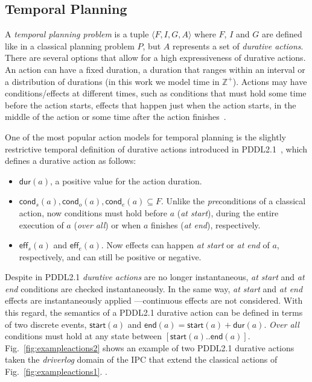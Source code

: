 \documentclass[runningheads]{llncs}
\newcommand{\tup}[1]{{\langle #1 \rangle}}
\newcommand{\eff}{\mathsf{eff}}    %
\newcommand{\cond}{\mathsf{cond}}  %
\newcommand{\dur}{\mathsf{dur}}    %
\newcommand{\start}{\mathsf{start}}%
\newcommand{\en}{\mathsf{end}}     %
\begin{document}
\subsection{Temporal Planning}
\label{sec:temporalplanning}
A {\em temporal planning problem} is a tuple $\tup{F,I,G,A}$ where $F$, $I$ and $G$ are defined like in a classical planning problem $P$, but $A$ represents a set of {\em durative actions}. There are several options that allow for a high expressiveness of durative actions. An action can have a fixed duration, a duration that ranges within an interval or a distribution of durations (in this work we model time in $\mathbb{Z}^+$). Actions may have conditions/effects at different times, such as conditions that must hold some time before the action starts, effects that happen just when the action starts, in the middle of the action or some time after the action finishes~\cite{garrido2009constraint}.

One of the most popular action models for temporal planning is the slightly restrictive temporal definition of durative actions introduced in PDDL2.1~\cite{fox2003pddl2}, which defines a durative action as follows:
\begin{itemize}
\item $\dur(a)$, a positive value for the action duration.
\item $\cond_s(a), \cond_o(a), \cond_e(a) \subseteq F$. Unlike the \emph{pre}conditions of a classical action, now conditions must hold before $a$ ({\em at start}), during the entire execution of $a$ ({\em over all}) or when $a$ finishes ({\em at end}), respectively.
\item $\eff_s(a)$ and $\eff_e(a)$. Now effects can happen {\em at start} or {\em at end} of $a$, respectively, and can still be positive or negative.
\end{itemize}

Despite in PDDL2.1 {\em durative actions} are no longer instantaneous, {\em at start} and {\em at end} conditions are checked instantaneously. In the same way, {\em at start} and {\em at end} effects are instantaneously applied ---continuous effects are not considered. With this regard, the semantics of a PDDL2.1 durative action can be defined in terms of two discrete events, $\start(a)$ and $\en(a)=\start(a)+\dur(a)$.
{\em Over all} conditions must hold at any state between $[\start(a)..\en(a)]$. Fig.~\ref{fig:exampleactions2} shows an example of two PDDL2.1 durative actions taken the \emph{driverlog} domain of the IPC that extend the classical actions of Fig.~\ref{fig:exampleactions1}. .
\end{document}
